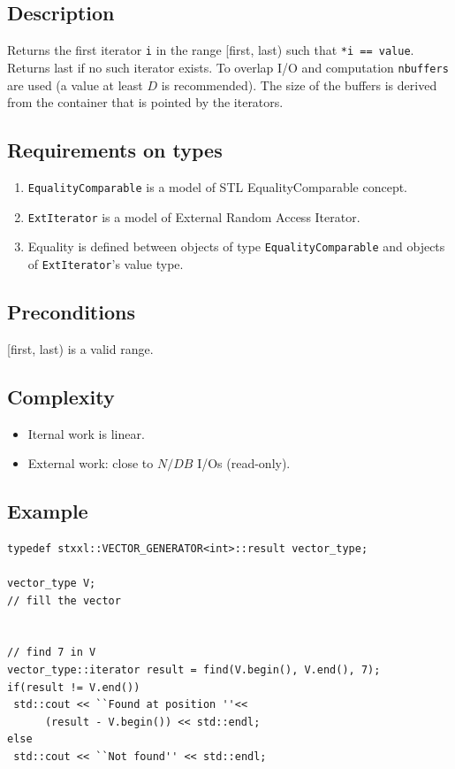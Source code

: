 \documentclass[twoside]{book}
\begin{document}
\subsection*{Description}
Returns the first iterator \texttt{i} in the range [first, last) such
that \texttt{*i == value}. Returns last if no such iterator exists.  
To
overlap I/O and computation \texttt{nbuffers} are used (a value at
least $D$ is recommended). The size of
the buffers is derived from the container that is pointed by the
iterators. 

\subsection*{Requirements on types}
\begin{enumerate}
\item \texttt{EqualityComparable} is a model of STL EqualityComparable
concept.
\item \texttt{ExtIterator} is a model of External Random Access
Iterator. 
\item Equality is defined between objects  of type
\texttt{EqualityComparable} and objects of \texttt{ExtIterator}'s
value type.
\end{enumerate}
\subsection*{Preconditions}
[first, last) is a valid range.
\subsection*{Complexity}
\begin{itemize}
\item Iternal work is linear.
\item External work: close to $N/DB$ I/Os (read-only).
\end{itemize}
\subsection*{Example}
\begin{lstlisting}
typedef stxxl::VECTOR_GENERATOR<int>::result vector_type;

vector_type V;
// fill the vector


// find 7 in V
vector_type::iterator result = find(V.begin(), V.end(), 7);
if(result != V.end())
 std::cout << ``Found at position ''<< 
      (result - V.begin()) << std::endl;
else
 std::cout << ``Not found'' << std::endl;
\end{lstlisting}
\end{document}
